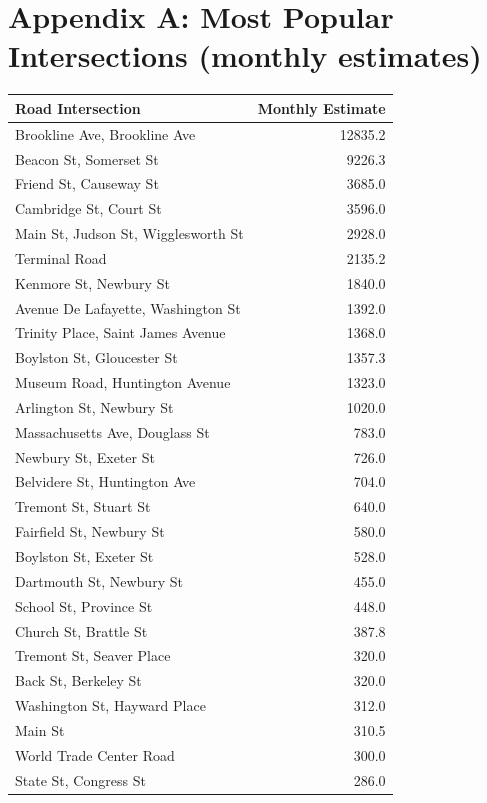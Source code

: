 \documentclass[twocolumn,10pt]{asme2ej}
\begin{document}
\section*{Appendix A: Most Popular Intersections (monthly estimates)}
\begin{tabular}{| l | r |}
\hline
Road Intersection & Monthly Estimate \\
\hline
\hline
Brookline Ave, Brookline Ave & 12835.2 \\
\hline
Beacon St, Somerset St & 9226.3\\
\hline
Friend St, Causeway St & 3685.0 \\
\hline
Cambridge St, Court St & 3596.0 \\
\hline
Main St, Judson St, Wigglesworth St & 2928.0 \\
\hline
Terminal Road & 2135.2 \\
\hline
Kenmore St, Newbury St & 1840.0 \\
\hline
Avenue De Lafayette, Washington St & 1392.0 \\
\hline
Trinity Place, Saint James Avenue & 1368.0 \\
\hline
Boylston St, Gloucester St & 1357.3 \\
\hline
Museum Road, Huntington Avenue & 1323.0 \\
\hline
Arlington St, Newbury St & 1020.0 \\
\hline
Massachusetts Ave, Douglass St & 783.0 \\
\hline
Newbury St, Exeter St & 726.0 \\
\hline
Belvidere St, Huntington Ave & 704.0 \\
\hline
Tremont St, Stuart St & 640.0 \\
\hline
Fairfield St, Newbury St & 580.0 \\
\hline
Boylston St, Exeter St & 528.0 \\
\hline
Dartmouth St, Newbury St & 455.0 \\
\hline
School St, Province St & 448.0 \\
\hline
Church St, Brattle St & 387.8 \\
\hline
Tremont St, Seaver Place & 320.0 \\
\hline
Back St, Berkeley St & 320.0 \\
\hline
Washington St, Hayward Place & 312.0 \\
\hline
Main St & 310.5 \\
\hline
World Trade Center Road & 300.0 \\
\hline
State St, Congress St & 286.0 \\

\end{tabular}
\end{document}
